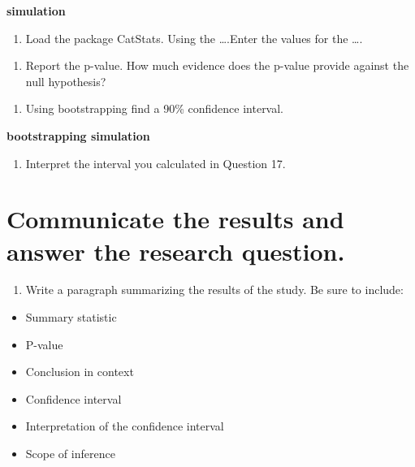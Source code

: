 \documentclass[
]{report}
\providecommand{\tightlist}{%
  \setlength{\itemsep}{0pt}\setlength{\parskip}{0pt}}
\begin{document}
\textbf{simulation}

\begin{enumerate}
\def\labelenumi{\arabic{enumi}.}
\setcounter{enumi}{14}
\tightlist
\item
  Load the package CatStats. Using the \ldots.Enter the values for the \ldots.
\end{enumerate}

\vspace{1in}

\begin{enumerate}
\def\labelenumi{\arabic{enumi}.}
\setcounter{enumi}{15}
\tightlist
\item
  Report the p-value. How much evidence does the p-value provide against the null hypothesis?
\end{enumerate}

\vspace{1in}

\begin{enumerate}
\def\labelenumi{\arabic{enumi}.}
\setcounter{enumi}{16}
\tightlist
\item
  Using bootstrapping find a 90\% confidence interval.
\end{enumerate}

\textbf{bootstrapping simulation}

\begin{enumerate}
\def\labelenumi{\arabic{enumi}.}
\setcounter{enumi}{17}
\tightlist
\item
  Interpret the interval you calculated in Question 17.
\end{enumerate}

\vspace{1in}

\hypertarget{communicate-the-results-and-answer-the-research-question.-1}{%
\section{Communicate the results and answer the research question.}\label{communicate-the-results-and-answer-the-research-question.-1}}

\begin{enumerate}
\def\labelenumi{\arabic{enumi}.}
\setcounter{enumi}{18}
\tightlist
\item
  Write a paragraph summarizing the results of the study. Be sure to include:
\end{enumerate}

\begin{itemize}
\item
  Summary statistic
\item
  P-value
\item
  Conclusion in context
\item
  Confidence interval
\item
  Interpretation of the confidence interval
\item
  Scope of inference
\end{itemize}
\end{document}
